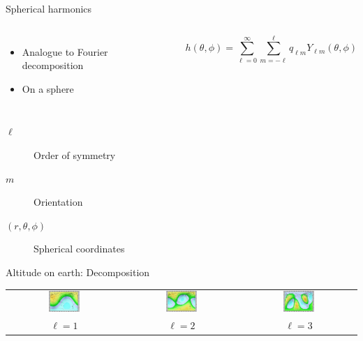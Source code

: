 \begin{frame}{Spherical harmonics}
	\begin{columns}
	\begin{itemize}
		\item Analogue to Fourier decomposition
		\item On a sphere
	\end{itemize}
	\[ h(\theta,\phi) = \sum_{\ell=0}^{\infty} \sum_{m=-\ell}^{\ell} q_{\ell m} Y_{\ell m}(\theta,\phi) \]
	\end{columns}
	\begin{description}
		\item[$\ell$] Order of symmetry
		\item[$m$] Orientation
		\item[$(r,\theta,\phi)$] Spherical coordinates
	\end{description}
	\begin{center}Altitude on earth: Decomposition\end{center}
	\begin{tabular}{ccc}
	\includegraphics[width=0.29\textwidth]{earth_l1} & \includegraphics[width=0.29\textwidth]{earth_l2} & \includegraphics[width=0.29\textwidth]{earth_l3} \\ 
	$\ell=1$ & $\ell=2$ & $\ell=3$ \\ 
	\end{tabular} 
\end{frame}

